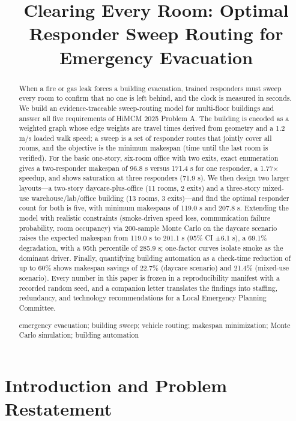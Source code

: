 \documentclass{mcmthesis}
\title{Clearing Every Room: Optimal Responder Sweep Routing for Emergency Evacuation}
\begin{document}
\begin{abstract}
When a fire or gas leak forces a building evacuation, trained responders must sweep every room to confirm that no one is left behind, and the clock is measured in seconds. We build an evidence-traceable sweep-routing model for multi-floor buildings and answer all five requirements of HiMCM 2025 Problem A. The building is encoded as a weighted graph whose edge weights are travel times derived from geometry and a 1.2 m/s loaded walk speed; a sweep is a set of responder routes that jointly cover all rooms, and the objective is the minimum makespan (time until the last room is verified). For the basic one-story, six-room office with two exits, exact enumeration gives a two-responder makespan of 96.8 s versus 171.4 s for one responder, a 1.77$\times$ speedup, and shows saturation at three responders (71.9 s). We then design two larger layouts---a two-story daycare-plus-office (11 rooms, 2 exits) and a three-story mixed-use warehouse/lab/office building (13 rooms, 3 exits)---and find the optimal responder count for both is five, with minimum makespans of 119.0 s and 207.8 s. Extending the model with realistic constraints (smoke-driven speed loss, communication failure probability, room occupancy) via 200-sample Monte Carlo on the daycare scenario raises the expected makespan from 119.0 s to 201.1 s (95\% CI $\pm$6.1 s), a 69.1\% degradation, with a 95th percentile of 285.9 s; one-factor curves isolate smoke as the dominant driver. Finally, quantifying building automation as a check-time reduction of up to 60\% shows makespan savings of 22.7\% (daycare scenario) and 21.4\% (mixed-use scenario). Every number in this paper is frozen in a reproducibility manifest with a recorded random seed, and a companion letter translates the findings into staffing, redundancy, and technology recommendations for a Local Emergency Planning Committee.
\begin{keywords}
emergency evacuation; building sweep; vehicle routing; makespan minimization; Monte Carlo simulation; building automation
\end{keywords}
\end{abstract}
\maketitle
\tableofcontents
\newpage

\section{Introduction and Problem Restatement}
\end{document}
